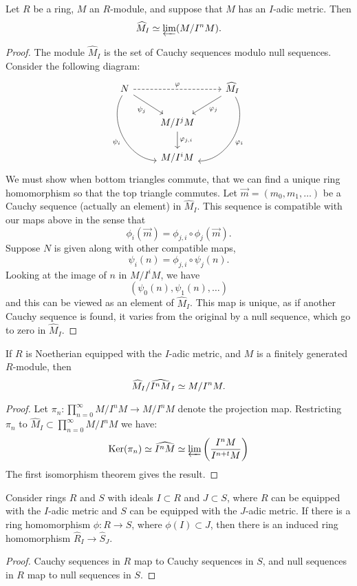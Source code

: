 \documentclass{ximera}
\begin{document}
\begin{theorem}
  Let $R$ be a ring, $M$ an $R$-module, and suppose that $M$ has an
  $I$-adic metric. Then
  \[
  \widehat{M}_I \simeq \varprojlim(M/I^n M).
  \]
  \begin{proof}
    The module $\hat{M}_I$ is the set of Cauchy sequences modulo null
    sequences.  Consider the following diagram:
    \[
    \begin{tikzcd}
      N\ar[ddr,bend right=60,swap,"\psi_i"] \ar[dr,swap,"\psi_j"]  \ar[dashed,rr,"\ph"] &   &  \hat{M}_{I} \ar[ddl,bend left=60,"\ph_i"] \ar[dl,"\ph_j"]\\
      & M/I^jM \ar[d,"\ph_{j,i}"] &\\
      & M/I^iM &
    \end{tikzcd}
    \]
    We must show when bottom triangles commute, that we can find a
    unique ring homomorphism so that the top triangle commutes. Let
    $\vec{m}=(m_0,m_1,\dots)$ be a Cauchy sequence (actually an element) in
    $\hat{M}_I$. This sequence is compatible with our maps above in
    the sense that
    \[
    \phi_i(\vec{m}) = \phi_{j,i} \circ \phi_j(\vec{m}).
    \]
    Suppose $N$ is given along with other compatible maps,
    \[
    \psi_i(n) = \phi_{j,i}\circ \psi_j(n).
    \]
    Looking at the image of $n$ in $M/I^iM$, we have
    \[
    (\psi_0(n), \psi_1(n),\dots)
    \]
    and this can be viewed as an element of $\hat{M}_{I}$. This map is
    unique, as if another Cauchy sequence is found, it varies from the
    original by a null sequence, which go to zero in $\hat{M}_{I}$.
  \end{proof}
\end{theorem}


\begin{corollary}\label{C:quotcomp}
  If $R$ is Noetherian equipped with the $I$-adic metric, and $M$ is a
  finitely generated $R$-module, then
  \[
  \widehat{M}_I/\widehat{I^n M}_I \simeq M/I^n M.
  \]
  \begin{proof}
    Let $\pi_n:\prod_{n=0}^\infty M/I^nM \to M/I^nM$ denote the
    projection map.  Restricting $\pi_n$ to $\hat{M}_I \subset
    \prod_{n=0}^\infty M/I^nM$ we have:
    \[
    \mathop{\mathrm{Ker}}\nolimits(\pi_n) \simeq \widehat{I^n M} \simeq \varprojlim \left(\frac{I^n M}{I^{n+t}M}\right)
    \]
    The first isomorphism theorem gives the result.
  \end{proof}
\end{corollary}





\begin{proposition}
  Consider rings $R$ and $S$ with ideals $I\subset R$ and $J\subset
  S$, where $R$ can be equipped with the $I$-adic metric and $S$ can
  be equipped with the $J$-adic metric. If there is a ring
  homomorphism $\phi:R \to S$, where $\phi(I) \subset J$, then there
  is an induced ring homomorphism $\hat{R}_I\to \hat{S}_J$.
  \begin{proof}
    Cauchy sequences in $R$ map to Cauchy sequences in $S$, and null
    sequences in $R$ map to null sequences in $S$.
  \end{proof}
\end{proposition}
\end{document}
